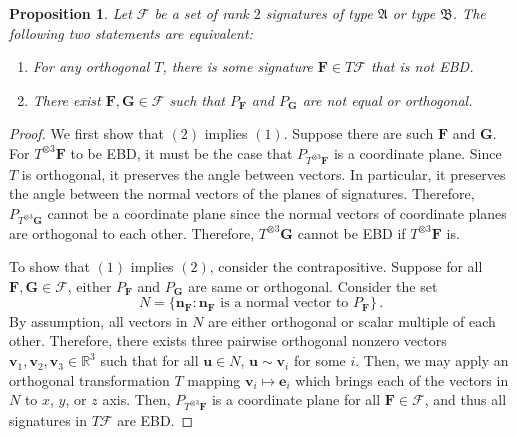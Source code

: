 \documentclass[11pt]{article}
\newtheorem{proposition}[theorem]{Proposition}
\newcommand{\teh}{^{\otimes 3}}
\newcommand{\strspt}{\textsf{EBD}\xspace}
\newcommand{\ternarytractgeneq}{$\mathfrak{A}$\xspace}
\newcommand{\ternarytractz}{$\mathfrak{B}$\xspace}
\begin{document}
\begin{proposition}\label{prop:cannot-strspt-plane}
  Let $\mathcal{F}$ be a set of rank $2$ signatures of type \ternarytractgeneq or type \ternarytractz.
  The following two statements are equivalent:
  \begin{enumerate}
    \item For any orthogonal $T$, there is some signature $\mathbf{F} \in T \mathcal{F}$ that is not \strspt.
    \item There exist $\mathbf{F}, \mathbf{G} \in \mathcal{F}$ such that $P_{\mathbf{F}}$ and $P_{\mathbf{G}}$ are not equal or orthogonal.
  \end{enumerate}
\end{proposition}
\begin{proof}
  We first show that $(2)$ implies $(1)$.
  Suppose there are such $\mathbf{F}$ and $\mathbf{G}$. 
  For $T \teh \mathbf{F}$ to be \strspt, it must be the case that $P_{T \teh \mathbf{F}}$ is a coordinate plane.
  Since $T$ is orthogonal, it preserves the angle between vectors.
  In particular, it preserves the angle between the normal vectors of the planes of signatures.
  Therefore, $P_{T\teh \mathbf{G}}$ cannot be a coordinate plane since the normal vectors of coordinate planes are orthogonal to each other.
  Therefore, $T\teh \mathbf{G}$ cannot be \strspt if $T \teh \mathbf{F}$ is.

  To show that $(1)$ implies $(2)$, consider the contrapositive. 
  Suppose for all $\mathbf{F}, \mathbf{G} \in \mathcal{F}$, either $P_{\mathbf{F}}$ and $P_{\mathbf{G}}$ are same or orthogonal.
  Consider the set
  \[
    N =   \{\mathbf{n}_{\mathbf{F}} : \mathbf{n}_{\mathbf{F}} \text{ is a normal vector to } P_{\mathbf{F}}\} \, .
  \]
  By assumption, all vectors in $N$ are either orthogonal or scalar multiple of each other.
  Therefore, there exists three pairwise orthogonal nonzero vectors $\mathbf{v}_1, \mathbf{v}_2, \mathbf{v}_3 \in \mathbb{R}^3$ such that for all $\mathbf{u} \in N$, $\mathbf{u} \sim \mathbf{v}_i$ for some $i$.
  Then, we may apply an orthogonal transformation $T$ mapping $\mathbf{v}_i \mapsto \mathbf{e}_i$ which brings each of the vectors in $N$ to $x$, $y$, or $z$ axis.
  Then, $P_{T\teh \mathbf{F}}$ is a coordinate plane for all $\mathbf{F} \in \mathcal{F}$, and thus all signatures in $T \mathcal{F}$ are \strspt.
\end{proof}
\end{document}
